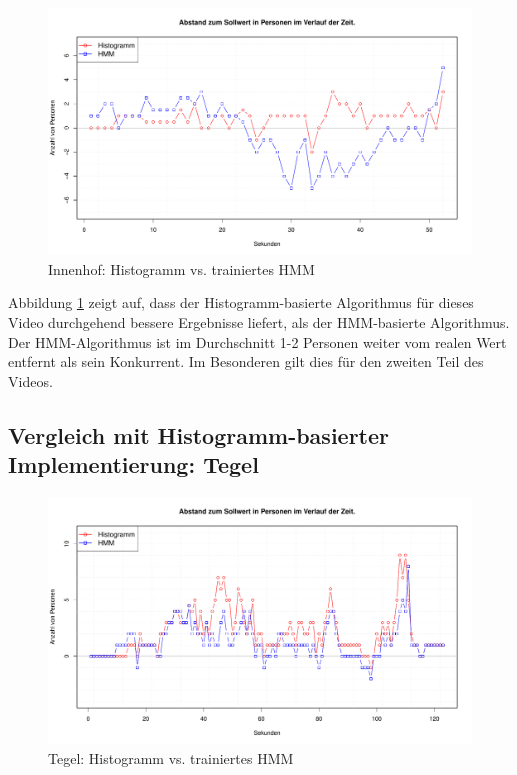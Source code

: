\begin{figure}
	\centering
\includegraphics[width=1\textwidth]{bilder/innenhof_910-1000_histo_vs_hmm_prelearned.pdf}
\caption{Innenhof: Histogramm vs. trainiertes HMM}
	\label{fig:Innenhof}
\end{figure}

Abbildung \ref{fig:Innenhof} zeigt auf, dass der Histogramm-basierte Algorithmus für dieses Video durchgehend bessere Ergebnisse liefert, als der HMM-basierte Algorithmus. Der HMM-Algorithmus ist im Durchschnitt 1-2 Personen weiter vom realen Wert entfernt als sein Konkurrent. Im Besonderen gilt dies für den zweiten Teil des Videos.

\subsection{Vergleich mit Histogramm-basierter Implementierung: Tegel}
\label{sec:eval:tegel}

\begin{figure}
	\centering
\includegraphics[width=1\textwidth]{bilder/tegel_7-55_histo_vs_prelearned_hmm.pdf}
	\caption{Tegel: Histogramm vs. trainiertes HMM}
	\label{fig:tegel}
\end{figure}


